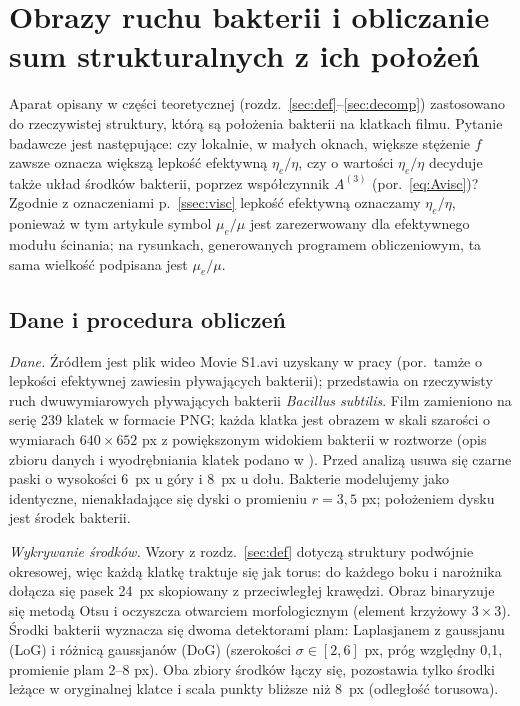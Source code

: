 \documentclass[12pt,a4paper,twoside,openright]{report}
\theoremstyle{definition}
\theoremstyle{remark}
\begin{document}
\chapter{\texorpdfstring{Obrazy ruchu bakterii i obliczanie sum strukturalnych z ich położeń}{Obrazy ruchu bakterii i obliczanie sum strukturalnych z ich położeń}}\label{sec:real}

Aparat opisany w części teoretycznej (rozdz.~\ref{sec:def}--\ref{sec:decomp}) zastosowano do rzeczywistej struktury, którą są położenia bakterii na klatkach filmu. Pytanie badawcze jest następujące: czy lokalnie, w małych oknach, większe stężenie $f$ zawsze oznacza większą lepkość efektywną $\eta_e/\eta$, czy o wartości $\eta_e/\eta$ decyduje także układ środków bakterii, poprzez współczynnik $A^{(3)}$ (por.~\eqref{eq:Avisc})? Zgodnie z oznaczeniami p.~\ref{ssec:visc} lepkość efektywną oznaczamy $\eta_e/\eta$, ponieważ w tym artykule symbol $\mu_e/\mu$ jest zarezerwowany dla efektywnego modułu ścinania; na rysunkach, generowanych programem obliczeniowym, ta sama wielkość podpisana jest $\mu_e/\mu$.

\section{\texorpdfstring{Dane i procedura obliczeń}{Dane i procedura obliczeń}}

\emph{Dane.} Źródłem jest plik wideo Movie S1.avi uzyskany w pracy \cite{ryan2013kinetic} (por.\ tamże o lepkości efektywnej zawiesin pływających bakterii); przedstawia on rzeczywisty ruch dwuwymiarowych pływających bakterii \emph{Bacillus subtilis}. Film zamieniono na serię 239 klatek w formacie PNG; każda klatka jest obrazem w skali szarości o wymiarach $640\times652$ px z powiększonym widokiem bakterii w roztworze (opis zbioru danych i wyodrębniania klatek podano w \cite{ligocki2025study}). Przed analizą usuwa się czarne paski o wysokości 6~px u góry i 8~px u dołu. Bakterie modelujemy jako identyczne, nienakładające się dyski o promieniu $r=3{,}5$ px; położeniem dysku jest środek bakterii.

\emph{Wykrywanie środków.} Wzory z rozdz.~\ref{sec:def} dotyczą struktury podwójnie okresowej, więc każdą klatkę traktuje się jak torus: do każdego boku i narożnika dołącza się pasek 24~px skopiowany z przeciwległej krawędzi. Obraz binaryzuje się metodą Otsu i oczyszcza otwarciem morfologicznym (element krzyżowy $3\times3$). Środki bakterii wyznacza się dwoma detektorami plam: Laplasjanem z gaussjanu (LoG) i różnicą gaussjanów (DoG) (szerokości $\sigma\in[2,6]$ px, próg względny 0,1, promienie plam 2--8 px). Oba zbiory środków łączy się, pozostawia tylko środki leżące w oryginalnej klatce i scala punkty bliższe niż 8~px (odległość torusowa).
\end{document}
